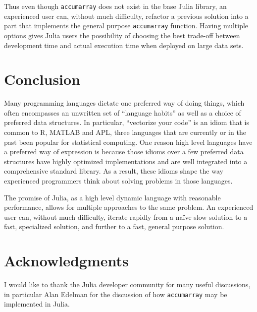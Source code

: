 \documentclass[11pt]{asaproc}
\begin{document}
Thus even though \lstinline|accumarray| does not exist in the base Julia
library, an experienced user can, without much difficulty, refactor a previous
solution into a part that implements the general purpose \lstinline|accumarray|
function. Having multiple options gives Julia users the possibility of choosing
the best trade-off between development time and actual execution time when
deployed on large data sets.


\section{Conclusion}

Many programming languages dictate one preferred way of doing things, which
often encompasses an unwritten set of ``language habits'' as well as a choice
of preferred data structures. In particular, ``vectorize your code'' is an
idiom that is common to R, MATLAB and APL, three languages that are currently
or in the past been popular for statistical computing. One reason high level
languages have a preferred way of expression is because those idioms over a few
preferred data structures have highly optimized implementations and are well
integrated into a comprehensive standard library. As a result, these idioms
shape the way experienced programmers think about solving problems in those
languages.

The promise of Julia, as a high level dynamic language with reasonable
performance, allows for multiple approaches to the same problem. An experienced
user can, without much difficulty, iterate rapidly from a na\"ive slow solution
to a fast, specialized solution, and further to a fast, general purpose
solution.



\section*{Acknowledgments}

I would like to thank the Julia developer community for many useful
discussions, in particular Alan Edelman for the discussion of how
\lstinline|accumarray| may be implemented in Julia.


\end{document}
